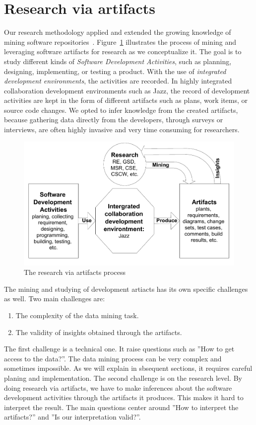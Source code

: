 \section{Research via artifacts}
Our research methodology applied and extended the growing knowledge of mining
software repositories~\cite{msr08}. Figure~\ref{fig:Framework} illustrates the
process of mining and leveraging software artifacts for research as we
conceptualize it. The goal is to study different kinds of \emph{Software
Development Activities}, such as planning, designing, implementing, or testing a
product. With the use of \emph{integrated development environments}, the
activities are recorded. In highly integrated collaboration development
environments such as Jazz, the record of development activities are kept in the
form of different artifacts such as plans, work items, or source code changes. We
opted to infer knowledge from the created artifacts, because gathering data
directly from the developers, through surveys or interviews, are often highly
invasive and very time consuming for researchers.


 \begin{figure}[t]
	\begin{center}
	\includegraphics[width=.99\columnwidth]{./Figures/Figure01Framework}
	\caption{The research via artifacts process}
	\label{fig:Framework}
	\end{center}
\end{figure}

The mining and studying of development artiacts has its own specific
challenges as well. Two main challenges are:
\begin{enumerate}
\item The complexity of the data mining task.
\item The validity of insights obtained through the artifacts.
\end{enumerate}
The first challenge is a technical one. It raise questions such as ''How to
get access to the data?''. The data mining process can be very complex and
sometimes impossible. As we will explain in sbsequent sections, it requires
careful planing and implementation. The second challenge is on the research level. By
doing research via artifacts, we have to make inferences about the software
development activities through the artifacts it produces. This makes it hard to
interpret the result. The main questions center around ''How to interpret the
artifacts?'' and ''Is our interpretation valid?''.

